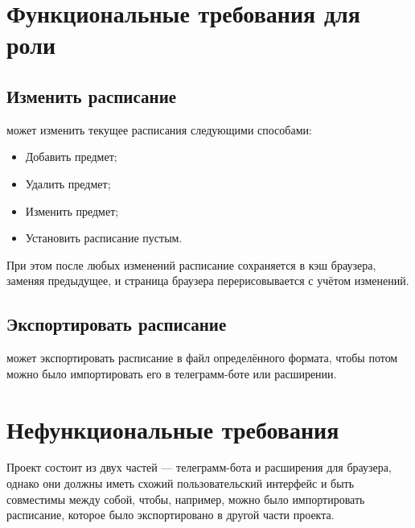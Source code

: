 	\section{Функциональные требования для роли }
		\subsection{Изменить расписание}
			  может изменить текущее расписания следующими способами:
			\begin{itemize}
				\item Добавить предмет;
				
				\item Удалить предмет;
				
				\item Изменить предмет;
				
				\item Установить расписание пустым.
			\end{itemize}
			
			При этом после любых изменений расписание сохраняется в кэш браузера, заменяя предыдущее, и страница браузера перерисовывается с учётом изменений.
		\subsection{Экспортировать расписание}
			 может экспортировать расписание в файл определённого формата, чтобы потом можно было импортировать его в телеграмм-боте или расширении.
	\section{Нефункциональные требования}
		Проект состоит из двух частей --- телеграмм-бота и расширения для браузера, однако они должны иметь схожий пользовательский интерфейс и быть совместимы между собой, чтобы, например, можно было импортировать расписание, которое было экспортировано в другой части проекта.
